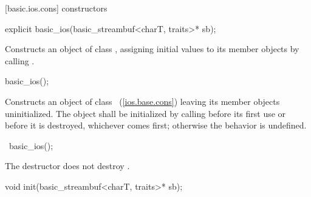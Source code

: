 [basic.ios.cons]{ constructors}

%
\begin{itemdecl}
explicit basic_ios(basic_streambuf<charT, traits>* sb);
\end{itemdecl}

\begin{itemdescr}
\pnum
\effects
Constructs an object of class
,
assigning initial values to its member objects by calling
.
\end{itemdescr}

%
\begin{itemdecl}
basic_ios();
\end{itemdecl}

\begin{itemdescr}
\pnum
\effects
Constructs an object of class
~(\ref{ios.base.cons})
leaving its member objects uninitialized. The object
shall be initialized by calling
before its first use or before it is destroyed, whichever comes first; otherwise the
behavior is undefined.
\end{itemdescr}

%
\begin{itemdecl}
~basic_ios();
\end{itemdecl}

\begin{itemdescr}
\pnum
\remarks
The destructor does not destroy
.
\end{itemdescr}

%
\begin{itemdecl}
void init(basic_streambuf<charT, traits>* sb);
\end{itemdecl}

